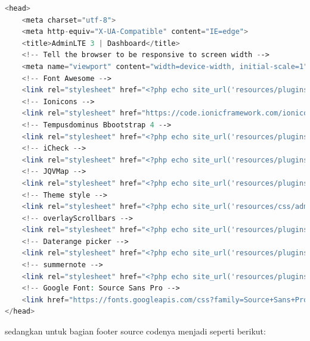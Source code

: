 \begin{lstlisting}[language=PHP]
<head>  
	<meta charset="utf-8">  
	<meta http-equiv="X-UA-Compatible" content="IE=edge">  
	<title>AdminLTE 3 | Dashboard</title>  
	<!-- Tell the browser to be responsive to screen width -->  
	<meta name="viewport" content="width=device-width, initial-scale=1">  
	<!-- Font Awesome -->  
	<link rel="stylesheet" href="<?php echo site_url('resources/plugins/fontawesome-free/css/all.min.css'); ?>">  
	<!-- Ionicons -->  
	<link rel="stylesheet" href="https://code.ionicframework.com/ionicons/2.0.1/css/ionicons.min.css">  
	<!-- Tempusdominus Bbootstrap 4 -->  
	<link rel="stylesheet" href="<?php echo site_url('resources/plugins/tempusdominus-bootstrap-4/css/tempusdominus-bootstrap-4.min.css'); ?>">  
	<!-- iCheck -->  
	<link rel="stylesheet" href="<?php echo site_url('resources/plugins/icheck-bootstrap/icheck-bootstrap.min.css'); ?>">  
	<!-- JQVMap -->  
	<link rel="stylesheet" href="<?php echo site_url('resources/plugins/jqvmap/jqvmap.min.css'); ?>">  
	<!-- Theme style -->  
	<link rel="stylesheet" href="<?php echo site_url('resources/css/adminlte.min.css'); ?>">  
	<!-- overlayScrollbars -->  
	<link rel="stylesheet" href="<?php echo site_url('resources/plugins/overlayScrollbars/css/OverlayScrollbars.min.css'); ?>">  
	<!-- Daterange picker -->  
	<link rel="stylesheet" href="<?php echo site_url('resources/plugins/daterangepicker/daterangepicker.css'); ?>">  
	<!-- summernote -->  
	<link rel="stylesheet" href="<?php echo site_url('resources/plugins/summernote/summernote-bs4.css'); ?>">  
	<!-- Google Font: Source Sans Pro -->  
	<link href="https://fonts.googleapis.com/css?family=Source+Sans+Pro:300,400,400i,700" rel="stylesheet">  
</head>  

\end{lstlisting}

sedangkan untuk bagian footer source codenya menjadi seperti berikut:


